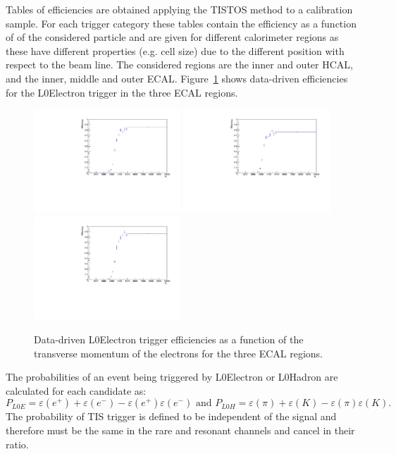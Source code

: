 Tables of efficiencies are obtained applying the TISTOS method to a calibration sample.
For each trigger category these tables contain the efficiency as a function of
\pt of the considered particle and are given for different calorimeter regions
as these have different properties (e.g. cell size) due to the different position
with respect to the beam line. The considered regions are the inner and outer HCAL, 
and the inner, middle and outer ECAL. Figure~\ref{sec:L0eff_tables} shows data-driven 
efficiencies for the L0Electron trigger in the three ECAL regions.
%
\begin{figure}[h!]
\centering
\includegraphics[width=0.49\textwidth]{RKst/figs/l0plots/l0E_Inner.pdf}
\includegraphics[width=0.49\textwidth]{RKst/figs/l0plots/l0E_Middle.pdf}
\includegraphics[width=0.49\textwidth]{RKst/figs/l0plots/l0E_Outer.pdf}
\caption{Data-driven L0Electron trigger efficiencies as a function of the transverse momentum
of the electrons for the three ECAL regions.}
\label{sec:L0eff_tables}
\end{figure}

The probabilities of an event being triggered by L0Electron or L0Hadron are calculated for each candidate as:
%
$$P_{L0E} = \varepsilon(e^+) + \varepsilon(e^-) - \varepsilon(e^+)\varepsilon(e^-) \text{ and }  
 P_{L0H} = \varepsilon(\pi) + \varepsilon(K) - \varepsilon(\pi)\varepsilon(K).$$
%
The probability of TIS trigger is defined to be independent of the signal and therefore must
be the same in the rare and resonant channels and cancel in their ratio.

